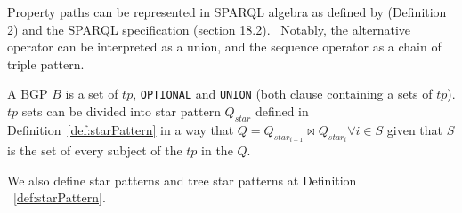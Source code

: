 Property paths can be represented in SPARQL algebra as defined by \citeauthor{Kostylev2015} (Definition 2) and the SPARQL specification (section 18.2).~
Notably, the alternative operator can be interpreted as a union, and the sequence operator as a chain of triple pattern.

\begin{definition}[BGP]\label{def:bgp}
 A BGP $B$ is a set of $tp$, \texttt{OPTIONAL} and \texttt{UNION} (both clause containing a sets of $tp$).
 $tp$ sets can be divided into star pattern $Q_{star}$ defined in Definition~\ref{def:starPattern} in a way 
 that $Q = Q_{star_{i-1}} \bowtie Q_{star_i} \forall i \in S$ given that $S$ is the set of every subject of the $tp$ in the $Q$.
\end{definition}
\fi

We also define star patterns and tree star patterns at Definition ~\ref{def:starPattern}.

